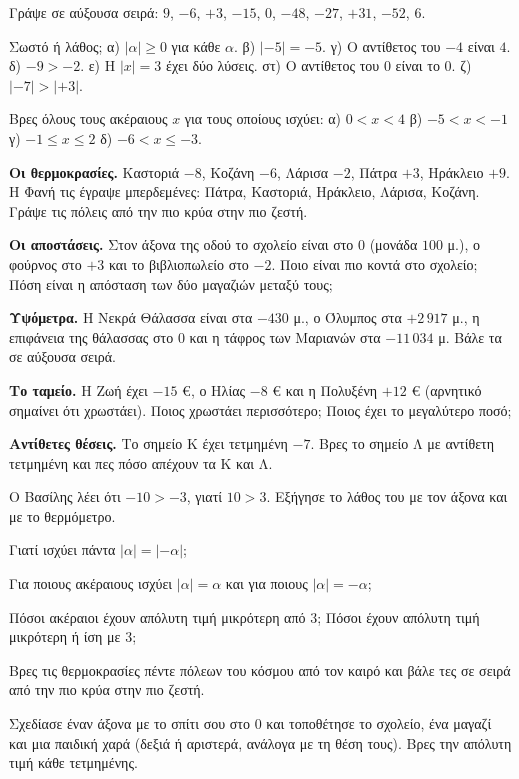 \ex Γράψε σε αύξουσα σειρά: $9$, $-6$, $+3$, $-15$, $0$, $-48$, $-27$, $+31$, $-52$, $6$.

\ex Σωστό ή λάθος; α) $|\alpha|\ge0$ για κάθε $\alpha$. \quad β) $|-5|=-5$. \quad γ) Ο αντίθετος του $-4$ είναι $4$. \quad δ) $-9>-2$. \quad ε) Η $|x|=3$ έχει δύο λύσεις. \quad στ) Ο αντίθετος του $0$ είναι το $0$. \quad ζ) $|-7|>|+3|$.

\ex Βρες όλους τους ακέραιους $x$ για τους οποίους ισχύει: α) $0<x<4$ \quad β) $-5<x<-1$ \quad γ) $-1\le x\le2$ \quad δ) $-6<x\le-3$.


\ex \textbf{Οι θερμοκρασίες.} Καστοριά $-8$, Κοζάνη $-6$, Λάρισα $-2$, Πάτρα $+3$, Ηράκλειο $+9$. Η Φανή τις έγραψε μπερδεμένες: Πάτρα, Καστοριά, Ηράκλειο, Λάρισα, Κοζάνη. Γράψε τις πόλεις από την πιο κρύα στην πιο ζεστή.

\ex \textbf{Οι αποστάσεις.} Στον άξονα της οδού το σχολείο είναι στο $0$ (μονάδα $100$ μ.), ο φούρνος στο $+3$ και το βιβλιοπωλείο στο $-2$. Ποιο είναι πιο κοντά στο σχολείο; Πόση είναι η απόσταση των δύο μαγαζιών μεταξύ τους;

\ex \textbf{Υψόμετρα.} Η Νεκρά Θάλασσα είναι στα $-430$ μ., ο Όλυμπος στα $+2\,917$ μ., η επιφάνεια της θάλασσας στο $0$ και η τάφρος των Μαριανών στα $-11\,034$ μ. Βάλε τα σε αύξουσα σειρά.

\ex \textbf{Το ταμείο.} Η Ζωή έχει $-15$ €, ο Ηλίας $-8$ € και η Πολυξένη $+12$ € (αρνητικό σημαίνει ότι χρωστάει). Ποιος χρωστάει περισσότερο; Ποιος έχει το μεγαλύτερο ποσό;

\ex \textbf{Αντίθετες θέσεις.} Το σημείο $\mathrm{Κ}$ έχει τετμημένη $-7$. Βρες το σημείο $\mathrm{Λ}$ με αντίθετη τετμημένη και πες πόσο απέχουν τα $\mathrm{Κ}$ και $\mathrm{Λ}$.


\ex Ο Βασίλης λέει ότι $-10>-3$, γιατί $10>3$. Εξήγησε το λάθος του με τον άξονα και με το θερμόμετρο.

\ex Γιατί ισχύει πάντα $|\alpha|=|-\alpha|$;

\ex Για ποιους ακέραιους ισχύει $|\alpha|=\alpha$ και για ποιους $|\alpha|=-\alpha$;

\ex Πόσοι ακέραιοι έχουν απόλυτη τιμή μικρότερη από $3$; Πόσοι έχουν απόλυτη τιμή μικρότερη ή ίση με $3$;


\ex Βρες τις θερμοκρασίες πέντε πόλεων του κόσμου από τον καιρό και βάλε τες σε σειρά από την πιο κρύα στην πιο ζεστή.

\ex Σχεδίασε έναν άξονα με το σπίτι σου στο $0$ και τοποθέτησε το σχολείο, ένα μαγαζί και μια παιδική χαρά (δεξιά ή αριστερά, ανάλογα με τη θέση τους). Βρες την απόλυτη τιμή κάθε τετμημένης.
